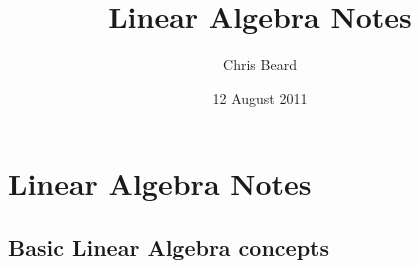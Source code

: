 \documentclass[10pt,letterpaper]{article}
\begin{document}
\title{Linear Algebra Notes}
\author{Chris Beard}
\date{12 August 2011}
\maketitle

\setcounter{tocdepth}{3}
\tableofcontents
\vspace*{1cm}


\section{Linear Algebra Notes}
\label{sec-1}
\subsection{Basic Linear Algebra concepts}
\label{sec-1_1}
\end{document}
